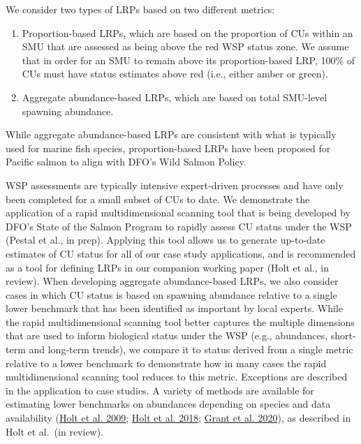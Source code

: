 \documentclass[11pt]{book}
\begin{document}
We consider two types of LRPs based on two different metrics:
\begin{enumerate}
\def\labelenumi{\arabic{enumi})}
\item
  Proportion-based LRPs, which are based on the proportion of CUs within an SMU that are assessed as being above the red WSP status zone. We assume that in order for an SMU to remain above its proportion-based LRP, 100\% of CUs must have status estimates above red (i.e., either amber or green).
\item
  Aggregate abundance-based LRPs, which are based on total SMU-level spawning abundance.
\end{enumerate}
While aggregate abundance-based LRPs are consistent with what is typically used for marine fish species, proportion-based LRPs have been proposed for Pacific salmon to align with DFO's Wild Salmon Policy.

WSP assessments are typically intensive expert-driven processes and have only been completed for a small subset of CUs to date. We demonstrate the application of a rapid multidimensional scanning tool that is being developed by DFO's State of the Salmon Program to rapidly assess CU status under the WSP (Pestal et al., in prep). Applying this tool allows us to generate up-to-date estimates of CU status for all of our case study applications, and is recommended as a tool for defining LRPs in our companion working paper (Holt et al., in review). When developing aggregate abundance-based LRPs, we also consider cases in which CU status is based on spawning abundance relative to a single lower benchmark that has been identified as important by local experts. While the rapid multidimensional scanning tool better captures the multiple dimensions that are used to inform biological status under the WSP (e.g., abundances, short-term and long-term trends), we compare it to status derived from a single metric relative to a lower benchmark to demonstrate how in many cases the rapid multidimensional scanning tool reduces to this metric. Exceptions are described in the application to case studies. A variety of methods are available for estimating lower benchmarks on abundances depending on species and data availability (\protect\hyperlink{ref-holtIndicatorsStatusBenchmarks2009}{Holt et al. 2009}; \protect\hyperlink{ref-holtEvaluatingBenchmarksBiological2018}{Holt et al. 2018}; \protect\hyperlink{ref-grant2017FraserSockeye2020}{Grant et al. 2020}), as described in Holt et al.~(in review).
\end{document}
